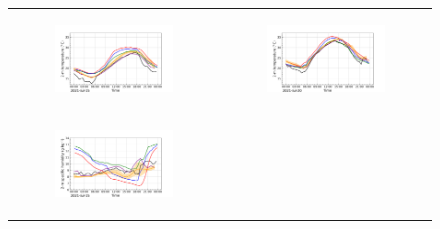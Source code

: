 \begin{figure}[hbtp]
    \centering
    \begin{tabular}{cc}
        \begin{subfigure}[t]{0.5\textwidth}
            \caption{}
            \includegraphics[width=\textwidth]{images/chap5/IOP_TS/TS_2021-07-15_cendrosa_t2m.png}
        \end{subfigure} &
        \begin{subfigure}[t]{0.5\textwidth}
            \caption{}
            \includegraphics[width=\textwidth]{images/chap5/IOP_TS/TS_2021-07-20_cendrosa_t2m.png}
        \end{subfigure} \\
        \begin{subfigure}[t]{0.5\textwidth}
            \caption{}
            \includegraphics[width=\textwidth]{images/chap5/IOP_TS/TS_2021-07-15_cendrosa_q2m.png}

\end{subfigure}
\end{tabular}
\end{figure}
